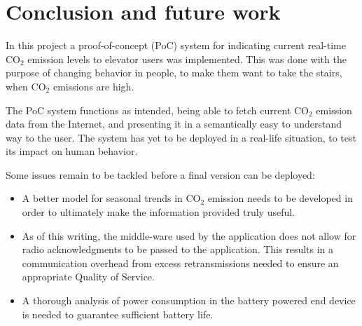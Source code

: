 \documentclass[Main]{subfiles}
\begin{document}
\section{Conclusion and future work} %
\label{sec:conclusionandfuturework}
	In this project a proof-of-concept (PoC) system for indicating current real-time CO$_2$ emission levels to elevator users was implemented.
	This was done with the purpose of changing behavior in people, to make them want to take the stairs, when CO$_2$ emissions are high. 

	The PoC system functions as intended, being able to fetch current CO$_2$ emission data from the Internet, and presenting it in a semantically easy to understand way to the user.
	The system has yet to be deployed in a real-life situation, to test its impact on human behavior.

	Some issues remain to be tackled before a final version can be deployed:

	\begin{itemize}
		\item 
			A better model for seasonal trends in CO$_2$ emission needs to be developed in order to ultimately make the information provided truly useful.

		\item
			As of this writing, the middle-ware used by the application does not allow for radio acknowledgments to be passed to the application.
			This results in a communication overhead from excess retransmissions needed to ensure an appropriate Quality of Service.

		\item 
			A thorough analysis of power consumption in the battery powered end device is needed to guarantee sufficient battery life.

	\end{itemize}

\end{document}
